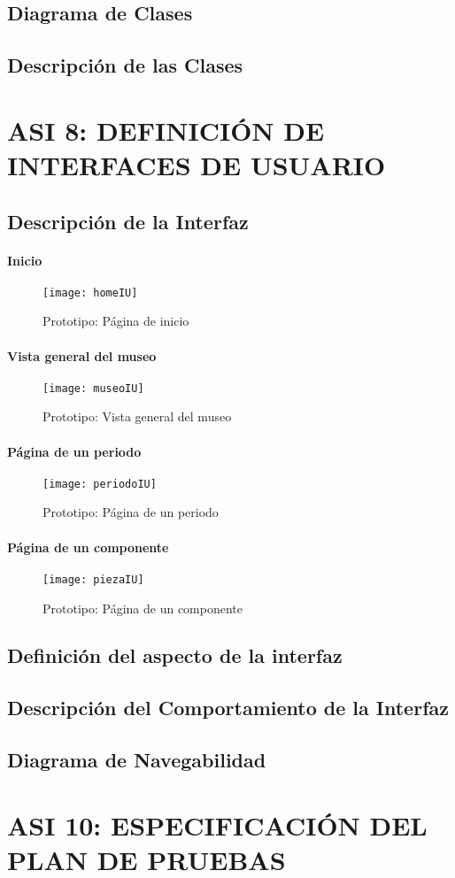 \subsection{Diagrama de Clases} 

\subsection{Descripción de las Clases}


\newpage
\section{ASI 8: DEFINICIÓN DE INTERFACES DE USUARIO}

\subsection{Descripción de la Interfaz} 
\paragraph*{Inicio}
\begin{figure}[H]
\centering
\texttt{[image: homeIU]}
\caption{Prototipo: Página de inicio}
\end{figure}
\paragraph*{Vista general del museo}
\begin{figure}[H]
\centering
\texttt{[image: museoIU]}
\caption{Prototipo: Vista general del museo}
\end{figure}
\paragraph*{Página de un periodo}
\begin{figure}[H]
\centering
\texttt{[image: periodoIU]}
\caption{Prototipo: Página de un periodo}
\end{figure}
\paragraph*{Página de un componente}
\begin{figure}[H]
\centering
\texttt{[image: piezaIU]}
\caption{Prototipo: Página de un componente}
\end{figure}

\subsection{Definición del aspecto de la interfaz}

\subsection{Descripción del Comportamiento de la Interfaz} 

\subsection{Diagrama de Navegabilidad}


\newpage
\section{ASI 10: ESPECIFICACIÓN DEL PLAN DE PRUEBAS}
